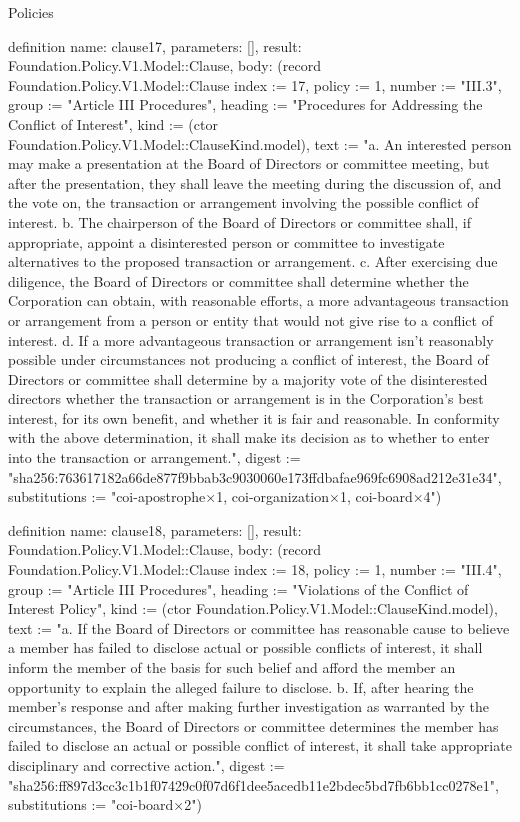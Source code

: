 \begin{lexlean}{Policies}
\begin{semanticmodule}
definition{
  name: clause17,
  parameters: [],
  result: Foundation.Policy.V1.Model::Clause,
  body: (record Foundation.Policy.V1.Model::Clause {index := 17, policy := 1, number := "III.3", group := "Article III Procedures", heading := "Procedures for Addressing the Conflict of Interest", kind := (ctor Foundation.Policy.V1.Model::ClauseKind.model), text := "a. An interested person may make a presentation at the Board of Directors or committee meeting, but after the presentation, they shall leave the meeting during the discussion of, and the vote on, the transaction or arrangement involving the possible conflict of interest. b. The chairperson of the Board of Directors or committee shall, if appropriate, appoint a disinterested person or committee to investigate alternatives to the proposed transaction or arrangement. c. After exercising due diligence, the Board of Directors or committee shall determine whether the Corporation can obtain, with reasonable efforts, a more advantageous transaction or arrangement from a person or entity that would not give rise to a conflict of interest. d. If a more advantageous transaction or arrangement isn’t reasonably possible under circumstances not producing a conflict of interest, the Board of Directors or committee shall determine by a majority vote of the disinterested directors whether the transaction or arrangement is in the Corporation's best interest, for its own benefit, and whether it is fair and reasonable. In conformity with the above determination, it shall make its decision as to whether to enter into the transaction or arrangement.", digest := "sha256:763617182a66de877f9bbab3c9030060e173ffdbafae969fc6908ad212e31e34", substitutions := "coi-apostrophe×1, coi-organization×1, coi-board×4"})
}

definition{
  name: clause18,
  parameters: [],
  result: Foundation.Policy.V1.Model::Clause,
  body: (record Foundation.Policy.V1.Model::Clause {index := 18, policy := 1, number := "III.4", group := "Article III Procedures", heading := "Violations of the Conflict of Interest Policy", kind := (ctor Foundation.Policy.V1.Model::ClauseKind.model), text := "a. If the Board of Directors or committee has reasonable cause to believe a member has failed to disclose actual or possible conflicts of interest, it shall inform the member of the basis for such belief and afford the member an opportunity to explain the alleged failure to disclose. b. If, after hearing the member's response and after making further investigation as warranted by the circumstances, the Board of Directors or committee determines the member has failed to disclose an actual or possible conflict of interest, it shall take appropriate disciplinary and corrective action.", digest := "sha256:ff897d3cc3c1b1f07429c0f07d6f1dee5acedb11e2bdec5bd7fb6bb1cc0278e1", substitutions := "coi-board×2"})
}


\end{semanticmodule}
\end{lexlean}
